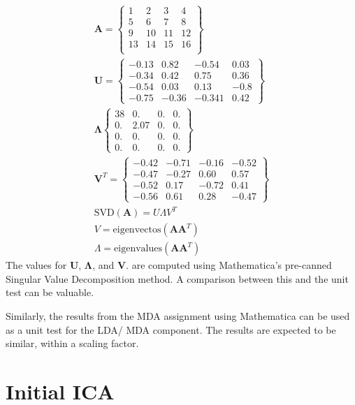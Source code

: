 \documentclass[12pt]{report}
\begin{document}
\begin{eqnarray}
\mathbf{A}= 
\left\{
\begin{array}{llll}
1	& 	2 	& 	3	& 	4 \\
5	&	6	& 	7	& 	8 \\
9	&	10	&	11	&	12 \\
13	&	14	&	15	&	16 \\
\end{array}
\right\} \\
\mathbf{U} = 
\left\{
\begin{array}{llll}
-0.13		& 0.82	& -0.54	& 0.03 \\
-0.34 	& 0.42	&  0.75	& 0.36	\\
-0.54		& 0.03	& 0.13	& -0.8	\\
-0.75		& -0.36	& -0.341	& 0.42
\end{array}
\right\} \\
\mathbf{\Lambda}
\left\{
\begin{array}{llll}
38	& 0. 		& 0. 	&  0.\\
0.		& 2.07	& 0.	& 0.\\
0.		& 0.		& 0.	& 0.\\
0.		& 0.		& 0.	& 0.
\end{array}
\right\} \\
\mathbf{V}^T =
\left\{
\begin{array}{llll}
-0.42		& -0.71	& -0.16	& -0.52	\\
-0.47		& -0.27	& 0.60	& 0.57	\\
-0.52		& 0.17	& -0.72	& 0.41	\\
-0.56		& 0.61	& 0.28	& -0.47
\end{array}
\right\} \\
\textrm{SVD} (\mathbf{A}) = U \Lambda V^T \\
V = \textrm{eigenvectos}(\mathbf{A}\mathbf{A}^T) \\
\Lambda = \textrm{eigenvalues}(\mathbf{A}\mathbf{A}^T) 
\end{eqnarray}
The values for $\mathbf{U}$, $\mathbf{\Lambda}$, and $\mathbf{V}$. are computed using Mathematica's pre-canned Singular Value Decomposition method.   A comparison between this and the unit test can be valuable. 

Similarly, the results from the MDA assignment using Mathematica can be used as a unit test for the LDA/ MDA component.  The results are expected to be similar, within a scaling factor.  

\section{Initial ICA}






\end{document}
